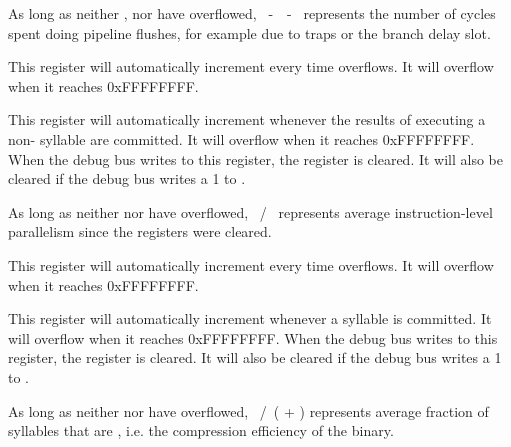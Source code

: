 As long as neither ,  nor  have overflowed,
~-~~-~ represents the number of cycles spent
doing pipeline flushes, for example due to traps or the branch delay slot.

\debugCanWrite{}


This register will automatically increment every time  overflows. It
will overflow when it reaches 0xFFFFFFFF.

\debugCanWrite{}


This register will automatically increment whenever the results of executing a
non- syllable are committed. It will overflow when it reaches
0xFFFFFFFF. When the debug bus writes to this register, the register is cleared.
It will also be cleared if the debug bus writes a 1 to .

As long as neither  nor  have overflowed,
~/~ represents average instruction-level parallelism since
the registers were cleared.

\debugCanWrite{}


This register will automatically increment every time  overflows. It
will overflow when it reaches 0xFFFFFFFF.

\debugCanWrite{}


This register will automatically increment whenever a  syllable is
committed. It will overflow when it reaches 0xFFFFFFFF. When the debug
bus writes to this register, the register is cleared. It will also be cleared
if the debug bus writes a 1 to .

As long as neither  nor  have overflowed,
~/~( + ) represents average fraction of syllables
that are , i.e. the compression efficiency of the binary.

